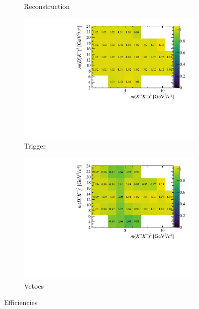 \begin{figure}[!h]
\begin{subfigure}[t]{0.4\textwidth}
      \caption{Reconstruction}
   \end{subfigure}
   \begin{subfigure}[t]{0.4\textwidth}
      \includegraphics[width=1.0\textwidth]{figs/B2DsKK/Relative_Eff_trig_All.pdf}
      \caption{Trigger}
   \end{subfigure}
   \begin{subfigure}[t]{0.4\textwidth}
      \includegraphics[width=1.0\textwidth]{figs/B2DsKK/Relative_Eff_veto_All.pdf}
      \caption{Vetoes}
   \end{subfigure}
   \caption{Efficiencies}
   \label{fig:B2DsKK_dalitz_eff_one}
\end{figure}

